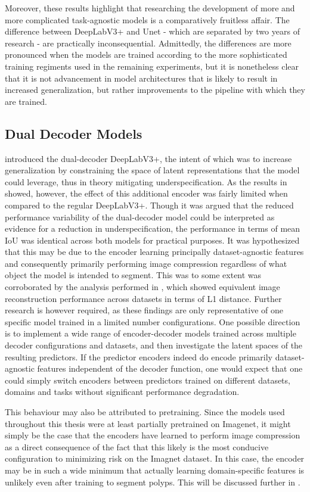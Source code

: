 Moreover, these results highlight that researching the development of more and more complicated task-agnostic models is a comparatively fruitless affair. The difference between DeepLabV3+ and Unet - which are separated by two years of research - are practically inconsequential. Admittedly, the differences are more pronounced when the models are trained according to the more sophisticated training regiments used in the remaining experiments, but it is nonetheless clear that it is not advancement in model architectures that is likely to result in increased generalization, but rather improvements to the pipeline with which they are trained.
\subsection{Dual Decoder Models}
 introduced the dual-decoder DeepLabV3+, the intent of which was to increase generalization by constraining the space of latent representations that the model could leverage, thus in theory mitigating underspecification. As the results in  showed, however, the effect of this additional encoder was fairly limited when compared to the regular DeepLabV3+. Though it was argued that the reduced performance variability of the dual-decoder model could be interpreted as evidence for a reduction in underspecification, the performance in terms of mean IoU was identical across both models for practical purposes. It was hypothesized that this may be due to the encoder learning principally dataset-agnostic features and consequently primarily performing image compression regardless of what object the model is intended to segment. This was to some extent was corroborated by the analysis performed in , which showed equivalent image reconstruction performance across datasets in terms of L1 distance. Further research is however required, as these findings are only representative of one specific model trained in a limited number configurations. One possible direction is to implement a wide range of encoder-decoder models trained across multiple decoder configurations and datasets, and then investigate the latent spaces of the resulting predictors. If the predictor encoders indeed do encode primarily dataset-agnostic features independent of the decoder function, one would expect that one could simply switch encoders between predictors trained on different datasets, domains and tasks without significant performance degradation. 

This behaviour may also be attributed to pretraining. Since the models used throughout this thesis were at least partially pretrained on Imagenet, it might simply be the case that the encoders have learned to perform image compression as a direct consequence of the fact that this likely is the most conducive configuration to minimizing risk on the Imagnet dataset. In this case, the encoder may be in such a wide minimum that actually learning domain-specific features is unlikely even after training to segment polyps. This will be discussed further in .


